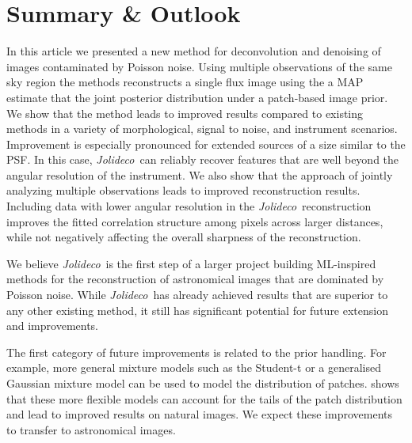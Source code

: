 \documentclass[twocolumn]{aastex631}
\newcommand{\jolideco}{\textit{Jolideco}~}
\begin{document}
    \section{Summary \& Outlook}
    In this article we presented a new method for deconvolution and denoising of images contaminated by Poisson noise. Using multiple observations of the same sky region the methods reconstructs a single flux image using the a MAP estimate that the joint posterior distribution under a patch-based image prior. We show that the method leads to improved results compared to existing methods in a variety of morphological, signal to noise, and instrument scenarios. Improvement is especially pronounced for extended sources of a size similar to the PSF. In this case, \jolideco can reliably recover features that are well beyond the angular resolution of the instrument. We also show that the approach of jointly analyzing multiple observations leads to improved reconstruction results. Including data with lower angular resolution in the \jolideco reconstruction improves the fitted correlation structure among pixels across larger distances, while not negatively affecting the overall sharpness of the reconstruction.


    We believe \jolideco is the first step of a larger project building ML-inspired methods for the reconstruction of astronomical images that are dominated by Poisson noise. While \jolideco has already achieved results that are superior to any other existing method, it still has significant potential for future extension and improvements.
    
    The first category of future improvements is related to the prior handling. For example, more general mixture models such as the Student-t or a generalised Gaussian mixture model can be used to model the distribution of patches. \citet{VanDenOord2014} shows that these more flexible models can account for the tails of the patch distribution and lead to improved results on natural images. We expect these improvements to transfer to astronomical images.
\end{document}
